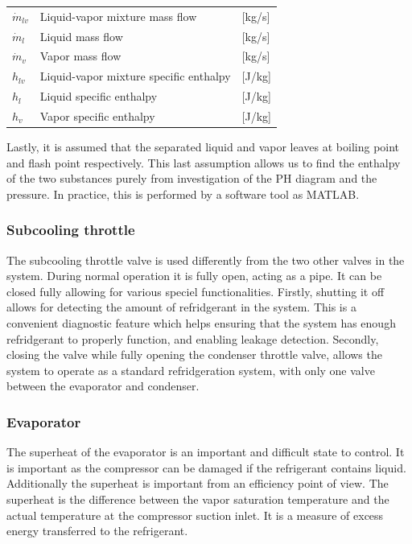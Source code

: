 \begin{center}
	\begin{tabular}{l p{8cm} l}
		$\dot{m}_{lv}$			&  Liquid-vapor mixture mass flow			& [\si{kg}/\si{s}]\\
		$\dot{m}_{l}$			&  Liquid mass flow 						& [\si{kg}/\si{s}] \\
		$\dot{m}_{v}$			&  Vapor mass flow							& [\si{kg}/\si{s}]\\
		$h_{lv}$				&  Liquid-vapor mixture specific enthalpy	& [\si{J}/\si{kg}]\\
		$h_{l}$					&  Liquid specific enthalpy 				& [\si{J}/\si{kg}] \\
		$h_{v}$					&  Vapor specific enthalpy					& [\si{J}/\si{kg}]\\
		
	\end{tabular}
\end{center}


Lastly, it is assumed that the separated liquid and vapor leaves at boiling point and flash point respectively. This last assumption allows us to find the enthalpy of the two substances purely from investigation of the PH diagram and the pressure. In practice, this is performed by a software tool as MATLAB.

\subsubsection{Subcooling throttle}
The subcooling throttle valve is used differently from the two other valves in the system. During normal operation it is fully open, acting as a pipe. It can be closed fully allowing for various speciel functionalities. Firstly, shutting it off allows for detecting the amount of refridgerant in the system. This is a convenient diagnostic feature which helps ensuring that the system has enough refridgerant to properly function, and enabling leakage detection. Secondly, closing the valve while fully opening the condenser throttle valve, allows the system to operate as a standard refridgeration system, with only one valve between the evaporator and condenser.

\subsubsection{Evaporator}
The superheat of the evaporator is an important and difficult state to control. It is important as the compressor can be damaged if the refrigerant contains liquid. Additionally the superheat is important from an efficiency point of view. 
The superheat is the difference between the vapor saturation temperature and the actual temperature at the compressor suction inlet. It is a measure of excess energy transferred to the refrigerant. 

